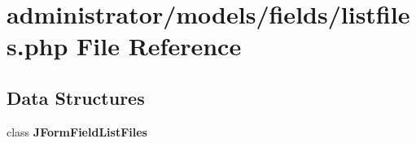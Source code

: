 \section{administrator/models/fields/listfiles.php File Reference}
\label{administrator_2models_2fields_2listfiles_8php}
\subsection*{Data Structures}
\begin{DoxyCompactItemize}
\item 
class \textbf{ J\+Form\+Field\+List\+Files}
\end{DoxyCompactItemize}
